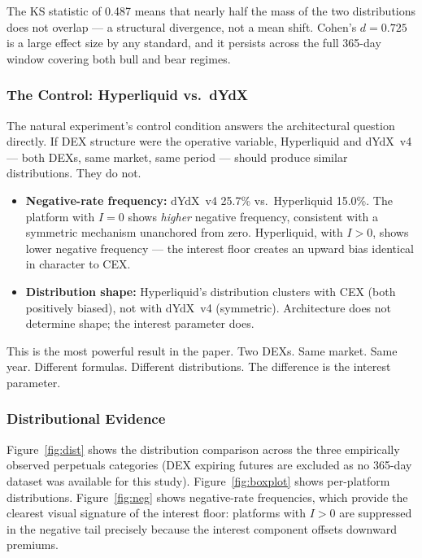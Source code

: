 \documentclass[10pt,twocolumn]{article}
\begin{document}
The KS statistic of 0.487 means that nearly half the mass of the two
distributions does not overlap --- a structural divergence, not a mean shift.
Cohen's $d = 0.725$ is a large effect size by any standard, and it persists
across the full 365-day window covering both bull and bear regimes.

\subsubsection{The Control: Hyperliquid vs.\ dYdX}

The natural experiment's control condition answers the architectural question
directly. If DEX structure were the operative variable, Hyperliquid and dYdX~v4
--- both DEXs, same market, same period --- should produce similar distributions.
They do not.

\begin{itemize}[noitemsep, leftmargin=*]
\item \textbf{Negative-rate frequency:} dYdX~v4 25.7\% vs.\ Hyperliquid 15.0\%.
The platform with $I=0$ shows \emph{higher} negative frequency, consistent with
a symmetric mechanism unanchored from zero. Hyperliquid, with $I > 0$, shows
lower negative frequency --- the interest floor creates an upward bias identical
in character to CEX.
\item \textbf{Distribution shape:} Hyperliquid's distribution clusters with CEX
(both positively biased), not with dYdX~v4 (symmetric). Architecture does not
determine shape; the interest parameter does.
\end{itemize}

This is the most powerful result in the paper. Two DEXs. Same market. Same
year. Different formulas. Different distributions. The difference is the
interest parameter.

\subsubsection{Distributional Evidence}

Figure~\ref{fig:dist} shows the distribution comparison across the three
empirically observed perpetuals categories (DEX expiring futures are excluded
as no 365-day dataset was available for this study).
Figure~\ref{fig:boxplot} shows per-platform distributions. Figure~\ref{fig:neg}
shows negative-rate frequencies, which provide the clearest visual signature of
the interest floor: platforms with $I > 0$ are suppressed in the negative tail
precisely because the interest component offsets downward premiums.
\end{document}
